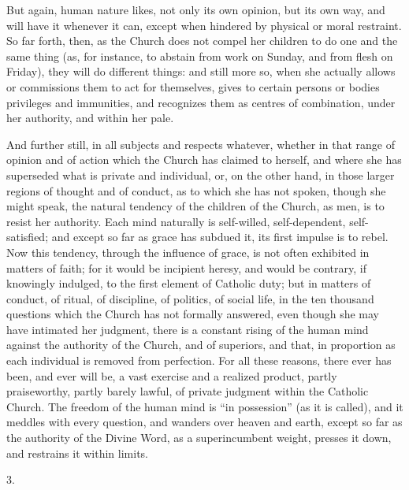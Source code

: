 But again, human nature likes, not only its own opinion, but its
own way, and will have it whenever it can, except when hindered by
physical or moral restraint. So far forth, then, as the Church does
not compel her children to do one and the same thing (as, for
instance, to abstain from work on Sunday, and from flesh on Friday),
they will do different things: and still more so, when she actually
allows or commissions them to act for themselves, gives to certain
persons or bodies privileges and immunities, and recognizes them as
centres of combination, under her authority, and within her pale.

And further still, in all subjects and respects whatever, whether
in that range of opinion and of action which the Church has claimed to
herself, and where she has superseded what is private and individual,
or, on the other hand, in those larger regions of thought and of
conduct, as to which she has not spoken, though she might speak, the
natural tendency of the children of the Church, as men, is to resist
her authority. Each mind naturally is self-willed, self-dependent,
self-satisfied; and except so far as grace has subdued it, its first
impulse is to rebel. Now this tendency, through the influence of
grace, is not often exhibited in matters of faith; for it would be
incipient heresy, and would be contrary, if knowingly indulged, to the
first element of Catholic duty; but in matters of conduct, of ritual,
of discipline, of politics, of social life, in the ten thousand
questions which the Church has not formally answered, even though she
may have intimated her judgment, there is a constant rising of the
human mind against the authority of the Church, and of superiors, and
that, in proportion as each individual is removed from perfection. For
all these reasons, there ever has been, and ever will be, a vast
exercise and a realized product, partly praiseworthy, partly barely
lawful, of private judgment within the Catholic Church. The freedom of
the human mind is ``in possession'' (as it is called), and it
meddles with every question, and wanders over heaven and earth, except
so far as the authority of the Divine Word, as a superincumbent
weight, presses it down, and restrains it within limits.

3.

